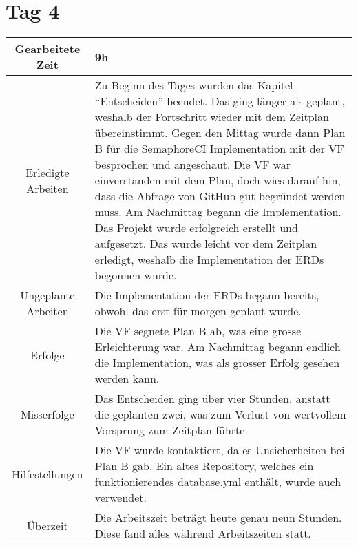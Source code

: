\newpage

\section{Tag 4}
\begin{tabularx}{\textwidth}[H]{|c|X|}
  \hline
  Gearbeitete Zeit & 9h \\ \hline
  Erledigte Arbeiten & Zu Beginn des Tages wurden das Kapitel \enquote{Entscheiden} beendet. Das ging länger als geplant,
  weshalb der Fortschritt wieder mit dem Zeitplan übereinstimmt. \newline
  Gegen den Mittag wurde dann Plan B für die SemaphoreCI Implementation mit der VF besprochen und angeschaut. Die VF war einverstanden mit 
  dem Plan, doch wies darauf hin, dass die Abfrage von GitHub gut begründet werden muss. \newline
  Am Nachmittag begann die Implementation. Das Projekt wurde erfolgreich erstellt und aufgesetzt. Das wurde leicht vor dem
  Zeitplan erledigt, weshalb die Implementation der ERDs begonnen wurde. \\ \hline
  Ungeplante Arbeiten & Die Implementation der ERDs begann bereits, obwohl das erst für morgen geplant wurde. \\ \hline
  Erfolge & Die VF segnete Plan B ab, was eine grosse Erleichterung war. Am Nachmittag begann endlich die Implementation,
  was als grosser Erfolg gesehen werden kann. \\ \hline
  Misserfolge & Das Entscheiden ging über vier Stunden, anstatt die geplanten zwei, was zum Verlust von wertvollem
  Vorsprung zum Zeitplan führte. \\ \hline
  Hilfestellungen & Die VF wurde kontaktiert, da es Unsicherheiten bei Plan B gab. Ein altes Repository, welches
  ein funktionierendes database.yml enthält, wurde auch verwendet. \\ \hline
  Überzeit & Die Arbeitszeit beträgt heute genau neun Stunden. Diese fand alles während Arbeitszeiten statt. \\ \hline
\end{tabularx}

\newpage

